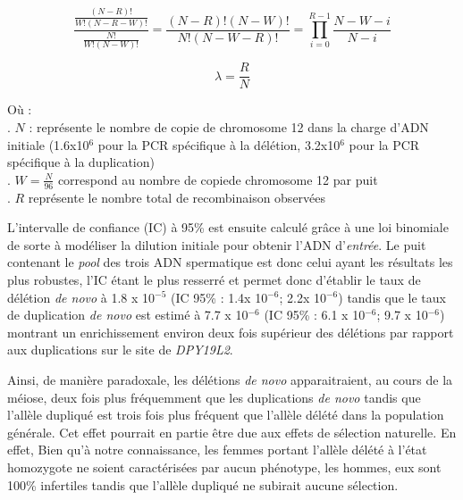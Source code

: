 \documentclass[12pt,twoside]{ugathesis}
\theoremstyle{definition}
\theoremstyle{definition}
\theoremstyle{remark}
\begin{document}
\begin{equation} 
\frac{\frac{(N - R)!}{W!(N-R-W)!}}{\frac{N!}{W!(N-W)!}} = \frac{(N-R)!(N-W)!}{N!(N-W-R)!} = \prod_{i=0}^{R-1}{\frac{N-W-i}{N-i}}
\label{eq:hypergeo}
\end{equation}

\begin{equation} 
\lambda = \frac{R}{N}
\label{eq:lambda}
\end{equation}

Où :\\
. \(N\) : représente le nombre de copie de chromosome 12 dans la charge
d'ADN initiale (1.6x10\({^6}\) pour la PCR spécifique à la délétion,
3.2x10\({^6}\) pour la PCR spécifique à la duplication)\\
. \(W = \frac{N}{96}\) correspond au nombre de copiede chromosome 12 par
puit\\
. \(R\) représente le nombre total de recombinaison observées

L'intervalle de confiance (IC) à 95\% est ensuite calculé grâce à une
loi binomiale de sorte à modéliser la dilution initiale pour obtenir
l'ADN d'\emph{entrée}. Le puit contenant le \emph{pool} des trois ADN
spermatique est donc celui ayant les résultats les plus robustes, l'IC
étant le plus resserré et permet donc d'établir le taux de délétion
\emph{de novo} à 1.8 x 10\(^{-5}\) (IC 95\% : 1.4x 10\(^{-6}\); 2.2x
10\(^{-6}\)) tandis que le taux de duplication \emph{de novo} est estimé
à 7.7 x 10\(^{-6}\) (IC 95\% : 6.1 x 10\(^{-6}\); 9.7 x 10\(^{-6}\))
montrant un enrichissement environ deux fois supérieur des délétions par
rapport aux duplications sur le site de \emph{DPY19L2}.

Ainsi, de manière paradoxale, les délétions \emph{de novo}
apparaitraient, au cours de la méiose, deux fois plus fréquemment que
les duplications \emph{de novo} tandis que l'allèle dupliqué est trois
fois plus fréquent que l'allèle délété dans la population générale. Cet
effet pourrait en partie être due aux effets de sélection naturelle. En
effet, Bien qu'à notre connaissance, les femmes portant l'allèle délété
à l'état homozygote ne soient caractérisées par aucun phénotype, les
hommes, eux sont 100\% infertiles tandis que l'allèle dupliqué ne
subirait aucune sélection.
\end{document}
